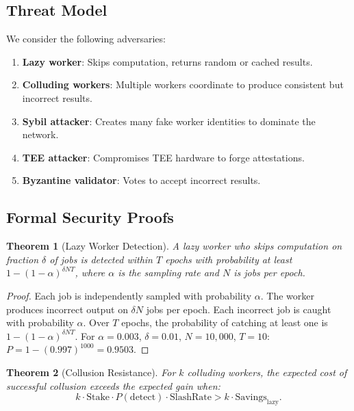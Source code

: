 \documentclass[11pt,twocolumn]{article}
\newtheorem{theorem}{Theorem}
\begin{document}
\subsection{Threat Model}

We consider the following adversaries:

\begin{enumerate}[leftmargin=1.4em]
    \item \textbf{Lazy worker}: Skips computation, returns random or cached results.
    \item \textbf{Colluding workers}: Multiple workers coordinate to produce consistent but incorrect results.
    \item \textbf{Sybil attacker}: Creates many fake worker identities to dominate the network.
    \item \textbf{TEE attacker}: Compromises TEE hardware to forge attestations.
    \item \textbf{Byzantine validator}: Votes to accept incorrect results.
\end{enumerate}

\subsection{Formal Security Proofs}

\begin{theorem}[Lazy Worker Detection]
A lazy worker who skips computation on fraction $\delta$ of jobs is detected within $T$ epochs with probability at least $1 - (1-\alpha)^{\delta N T}$, where $\alpha$ is the sampling rate and $N$ is jobs per epoch.
\end{theorem}

\begin{proof}
Each job is independently sampled with probability $\alpha$. The worker produces incorrect output on $\delta N$ jobs per epoch. Each incorrect job is caught with probability $\alpha$. Over $T$ epochs, the probability of catching at least one is $1 - (1-\alpha)^{\delta N T}$. For $\alpha = 0.003$, $\delta = 0.01$, $N = 10{,}000$, $T = 10$: $P = 1 - (0.997)^{1000} = 0.9503$.
\end{proof}

\begin{theorem}[Collusion Resistance]
For $k$ colluding workers, the expected cost of successful collusion exceeds the expected gain when:
\begin{equation}
k \cdot \text{Stake} \cdot P(\text{detect}) \cdot \text{SlashRate} > k \cdot \text{Savings}_{\text{lazy}}.
\end{equation}
\end{theorem}
\end{document}
